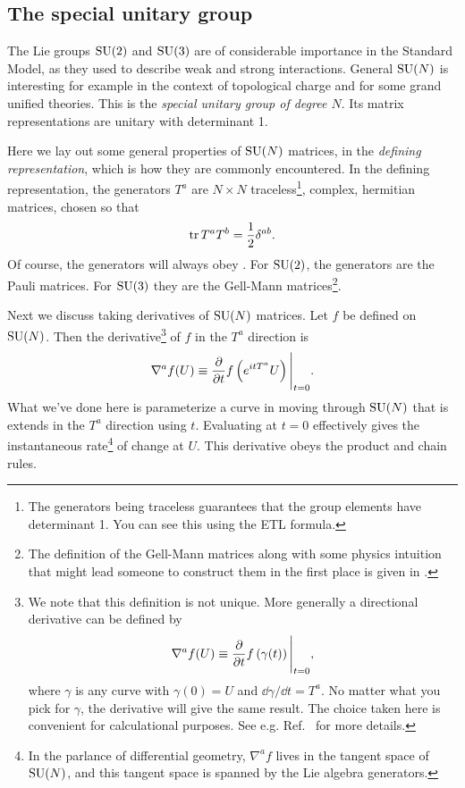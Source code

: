 \subsection{The special unitary group}

The Lie groups $\operatorname{SU}(2)$ and $\operatorname{SU}(3)$ are of considerable importance in the
Standard Model, as they used to describe weak and strong interactions.
General $\operatorname{SU}(N)$ is interesting for example
in the context of topological charge and for some grand unified theories.
This is the 
{\it special unitary group of degree $N$}. Its matrix
representations are unitary with determinant 1.

Here we lay out some general properties of $\operatorname{SU}(N)$ matrices,
in the {\it defining representation},
which is how they are commonly encountered.
In the defining representation, the generators $T^a$ are $N\times N$
traceless\footnote{The generators being traceless guarantees
that the group elements have determinant 1. You can see this using 
the ETL formula.}, complex, hermitian matrices, chosen so that
\begin{equation}\label{eq:SUNnorm}
\tr T^a T^b=\frac{1}{2}\delta^{ab}.
\end{equation}
Of course, the generators will always obey .
For $\operatorname{SU}(2)$, the generators are the Pauli matrices. For
$\operatorname{SU}(3)$ they are the Gell-Mann matrices\footnote{The definition
of the Gell-Mann matrices along with some physics intuition that
might lead someone to construct them in the first place
is given in .}.

Next we discuss taking derivatives of $\operatorname{SU}(N)$ matrices.
Let $f$ be defined on $\operatorname{SU}(N)$. Then the 
derivative\footnote{We note that this definition is not unique.
More generally a directional derivative can be defined by
$$
\nabla^af(U)\equiv\pdv{}{t}f\left(\gamma(t)\right)\Bigg|_{t=0},
$$
where $\gamma$ is any curve with $\gamma(0)=U$ and
$\dd\gamma/\dd t=T^a$. No matter what you pick for $\gamma$,
the derivative will give the same result. The choice taken here
is convenient for calculational purposes.
See e.g. Ref.~\cite{hall_lie_2003} for more details.
}
of $f$ in the $T^a$ direction is
\begin{equation}\label{eq:lieDeriv}
\nabla^af(U)\equiv\pdv{}{t}f\left(e^{itT^a}U\right)\Bigg|_{t=0}.
\end{equation}
What we've done here is parameterize a curve in moving through $\operatorname{SU}(N)$ that is
extends in the $T^a$ direction using $t$. Evaluating at $t=0$
effectively gives the instantaneous rate\footnote{In the parlance
of differential geometry, $\nabla^a f$ lives in the tangent space
of $\operatorname{SU}(N)$, and this tangent space is spanned by the Lie algebra generators.} 
of change at $U$. This derivative obeys the product and chain rules.

